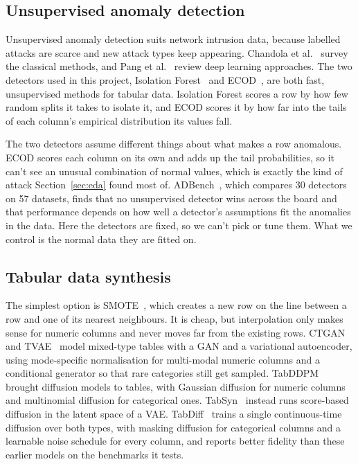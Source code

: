 \documentclass[11pt,a4paper]{article}
\begin{document}
\subsection{Unsupervised anomaly detection}

Unsupervised anomaly detection suits network intrusion data, because labelled attacks are scarce and new attack types keep appearing. Chandola et al.~\cite{chandola2009survey} survey the classical methods, and Pang et al.~\cite{pang2021deep} review deep learning approaches. The two detectors used in this project, Isolation Forest~\cite{liu2008iforest} and ECOD~\cite{li2022ecod}, are both fast, unsupervised methods for tabular data. Isolation Forest scores a row by how few random splits it takes to isolate it, and ECOD scores it by how far into the tails of each column's empirical distribution its values fall.

The two detectors assume different things about what makes a row anomalous. ECOD scores each column on its own and adds up the tail probabilities, so it can't see an unusual combination of normal values, which is exactly the kind of attack Section~\ref{sec:eda} found most of. ADBench~\cite{han2022adbench}, which compares 30 detectors on 57 datasets, finds that no unsupervised detector wins across the board and that performance depends on how well a detector's assumptions fit the anomalies in the data. Here the detectors are fixed, so we can't pick or tune them. What we control is the normal data they are fitted on.

\subsection{Tabular data synthesis}

The simplest option is SMOTE~\cite{chawla2002smote}, which creates a new row on the line between a row and one of its nearest neighbours. It is cheap, but interpolation only makes sense for numeric columns and never moves far from the existing rows. CTGAN and TVAE~\cite{xu2019ctgan} model mixed-type tables with a GAN and a variational autoencoder, using mode-specific normalisation for multi-modal numeric columns and a conditional generator so that rare categories still get sampled. TabDDPM~\cite{kotelnikov2023tabddpm} brought diffusion models to tables, with Gaussian diffusion for numeric columns and multinomial diffusion for categorical ones. TabSyn~\cite{zhang2024tabsyn} instead runs score-based diffusion in the latent space of a VAE. TabDiff~\cite{shi2025tabdiff} trains a single continuous-time diffusion over both types, with masking diffusion for categorical columns and a learnable noise schedule for every column, and reports better fidelity than these earlier models on the benchmarks it tests.
\end{document}
